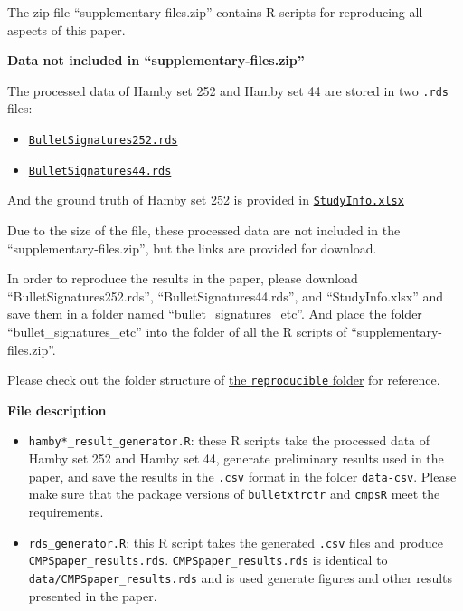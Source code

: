 The zip file ``supplementary-files.zip'' contains R scripts for reproducing all aspects of this paper.

\textbf{Data not included in ``supplementary-files.zip''}

The processed data of Hamby set 252 and Hamby set 44 are stored in two \texttt{.rds} files:

\begin{itemize}
\tightlist
\item
  \href{https://github.com/willju-wangqian/CMPSpaper/blob/main/reproducible/bullet_signatures_etc/BulletSignatures252.rds}{\texttt{BulletSignatures252.rds}}
\item
  \href{https://github.com/willju-wangqian/CMPSpaper/blob/main/reproducible/bullet_signatures_etc/BulletSignatures44.rds}{\texttt{BulletSignatures44.rds}}
\end{itemize}

And the ground truth of Hamby set 252 is provided in \href{https://github.com/willju-wangqian/CMPSpaper/blob/main/reproducible/bullet_signatures_etc/StudyInfo.xlsx}{\texttt{StudyInfo.xlsx}}

Due to the size of the file, these processed data are not included in the ``supplementary-files.zip'', but the links are provided for download.

In order to reproduce the results in the paper, please download ``BulletSignatures252.rds'', ``BulletSignatures44.rds'', and ``StudyInfo.xlsx'' and save them in a folder named ``bullet\_signatures\_etc''. And place the folder ``bullet\_signatures\_etc'' into the folder of all the R scripts of ``supplementary-files.zip''.

Please check out the folder structure of \href{https://github.com/willju-wangqian/CMPSpaper/tree/main/reproducible}{the \texttt{reproducible} folder} for reference.

\textbf{File description}

\begin{itemize}
\tightlist
\item
  \texttt{hamby*\_result\_generator.R}: these R scripts take the processed data of Hamby set 252 and Hamby set 44, generate preliminary results used in the paper, and save the results in the \texttt{.csv} format in the folder \texttt{data-csv}. Please make sure that the package versions of \texttt{bulletxtrctr} and \texttt{cmpsR} meet the requirements.
\item
  \texttt{rds\_generator.R}: this R script takes the generated \texttt{.csv} files and produce \texttt{CMPSpaper\_results.rds}. \texttt{CMPSpaper\_results.rds} is identical to \texttt{data/CMPSpaper\_results.rds} and is used generate figures and other results presented in the paper.
\end{itemize}

